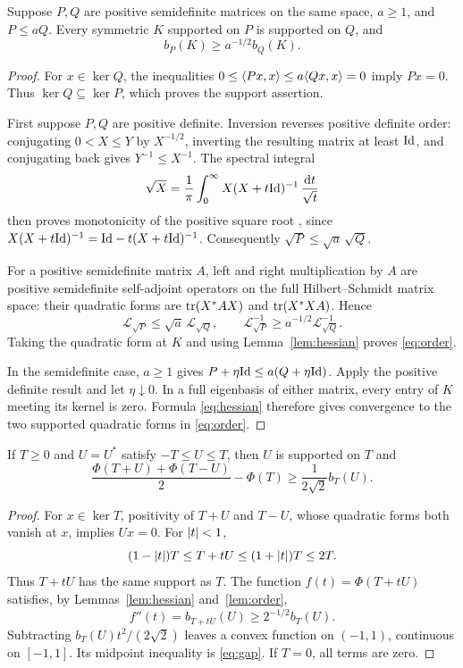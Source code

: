\begin{lemma}\label{lem:order}
Suppose \(P,Q\) are positive semidefinite matrices on the same space,
\(a\ge1\), and \(P\le aQ\). Every symmetric \(K\) supported on \(P\)
is supported on \(Q\), and
\begin{equation}\label{eq:order}
 b_P(K)\ge a^{-1/2}b_Q(K).
\end{equation}
\end{lemma}

\begin{proof}
For \(x\in\ker Q\), the inequalities
\(0\le\langle Px,x\rangle\le a\langle Qx,x\rangle=0\) imply \(Px=0\).
Thus \(\ker Q\subseteq\ker P\), which proves the support assertion.

First suppose \(P,Q\) are positive definite. Inversion reverses
positive definite order: conjugating \(0<X\le Y\) by \(X^{-1/2}\),
inverting the resulting matrix at least \(\mathrm{Id}\), and conjugating back
gives \(Y^{-1}\le X^{-1}\). The spectral integral
\[
 \sqrt X=\frac1\pi\int_0^\infty
        X(X+t\mathrm{Id})^{-1}\,\frac{\mathrm dt}{\sqrt t}
\]
then proves monotonicity of the positive square root
\cite[Theorem, p.~309]{Pedersen1972}, since
\(X(X+t\mathrm{Id})^{-1}=\mathrm{Id}-t(X+t\mathrm{Id})^{-1}\). Consequently
\(\sqrt P\le\sqrt a\,\sqrt Q\).

For a positive semidefinite matrix \(A\), left and right multiplication
by \(A\) are positive semidefinite self-adjoint operators on the full
Hilbert--Schmidt matrix space: their quadratic forms are
\(\operatorname{tr}(X^*AX)\) and \(\operatorname{tr}(X^*XA)\). Hence
\[
 \mathcal L_{\sqrt P}\le\sqrt a\,\mathcal L_{\sqrt Q},
 \qquad
 \mathcal L_{\sqrt P}^{-1}
       \ge a^{-1/2}\mathcal L_{\sqrt Q}^{-1}.
\]
Taking the quadratic form at \(K\) and using Lemma~\ref{lem:hessian}
proves \eqref{eq:order}.

In the semidefinite case, \(a\ge1\) gives
\(P+\eta\mathrm{Id}\le a(Q+\eta\mathrm{Id})\). Apply the positive definite result
and let \(\eta\downarrow0\). In a full eigenbasis of either matrix,
every entry of \(K\) meeting its kernel is zero. Formula
\eqref{eq:hessian} therefore gives convergence to the two supported
quadratic forms in \eqref{eq:order}.
\end{proof}

\begin{corollary}\label{cor:gap}
If \(T\ge0\) and \(U=U^*\) satisfy \(-T\le U\le T\), then \(U\) is
supported on \(T\) and
\begin{equation}\label{eq:gap}
 \frac{\Phi(T+U)+\Phi(T-U)}2-\Phi(T)
       \ge\frac{1}{2\sqrt2}b_T(U).
\end{equation}
\end{corollary}

\begin{proof}
For \(x\in\ker T\), positivity of \(T+U\) and \(T-U\), whose quadratic
forms both vanish at \(x\), implies \(Ux=0\).
For \(\lvert t\rvert<1\),
\[
 (1-\lvert t\rvert)T\le T+tU\le(1+\lvert t\rvert)T\le2T.
\]
Thus \(T+tU\) has the same support as \(T\). The function
\(f(t)=\Phi(T+tU)\) satisfies, by Lemmas~\ref{lem:hessian}
and~\ref{lem:order},
\[
 f''(t)=b_{T+tU}(U)\ge 2^{-1/2}b_T(U).
\]
Subtracting \(b_T(U)t^2/(2\sqrt2)\) leaves a convex function on
\((-1,1)\), continuous on \([-1,1]\). Its midpoint inequality is
\eqref{eq:gap}. If \(T=0\), all terms are zero.
\end{proof}
